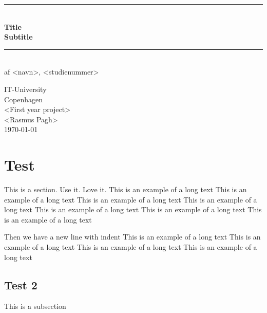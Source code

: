 \documentclass[a4paper,11pt]{article}
\begin{document}
\begin{titlepage}
\centering \parindent=0pt
\newcommand{\HRule}{\rule{\textwidth}{1mm}}
 \HRule\\[1cm]\Huge\bfseries
Title\\[0.7cm]
\large Subtitle\\[1cm]
\HRule\\[4cm]  \large af <navn>, <studienummer>\\
 \normalsize %
\begin{flushleft}
IT-University\\
Copenhagen\\
<First year project>\\
<Rasmus Pagh>\\
\today \end{flushleft}
\end{titlepage}

\tableofcontents
\pagebreak

\section{Test}

This is a section. Use it. Love it.
This is an example of a long text
This is an example of a long text
This is an example of a long text
This is an example of a long text
This is an example of a long text
This is an example of a long text
This is an example of a long text

Then we have a new line with indent
This is an example of a long text
This is an example of a long text
This is an example of a long text
This is an example of a long text

\subsection{Test 2}

This is a subsection
\end{document}

